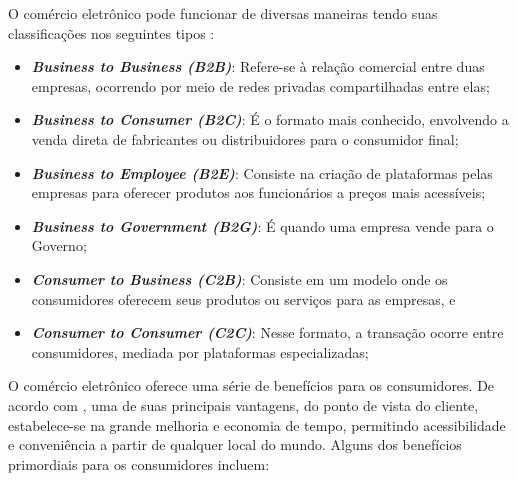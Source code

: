 O comércio eletrônico pode funcionar de diversas maneiras tendo suas classificações nos seguintes tipos \cite{MendoncaEcommerce}:

\begin{itemize}
    \item \textbf{\textit{Business to Business (B2B)}}: Refere-se à relação comercial entre duas empresas, ocorrendo por meio de redes privadas compartilhadas entre elas;
    \item \textbf{\textit{Business to Consumer (B2C)}}: É o formato mais conhecido, envolvendo a venda direta de fabricantes ou distribuidores para o consumidor final;
    \item \textbf{\textit{Business to Employee (B2E)}}: Consiste na criação de plataformas pelas empresas para oferecer produtos aos funcionários a preços mais acessíveis;
    \item \textbf{\textit{Business to Government (B2G)}}: É quando uma empresa vende para o Governo;
    \item \textbf{\textit{Consumer to Business (C2B)}}: Consiste em um modelo onde os consumidores oferecem seus produtos ou serviços para as empresas, e
    \item \textbf{\textit{Consumer to Consumer (C2C)}}: Nesse formato, a transação ocorre entre consumidores, mediada por plataformas especializadas;
\end{itemize}

O comércio eletrônico oferece uma série de benefícios para os consumidores. De acordo com , uma de suas principais vantagens, do ponto de vista do cliente, estabelece-se na grande melhoria e economia de tempo, permitindo acessibilidade e conveniência a partir de qualquer local do mundo. Alguns dos benefícios primordiais para os consumidores incluem: 

